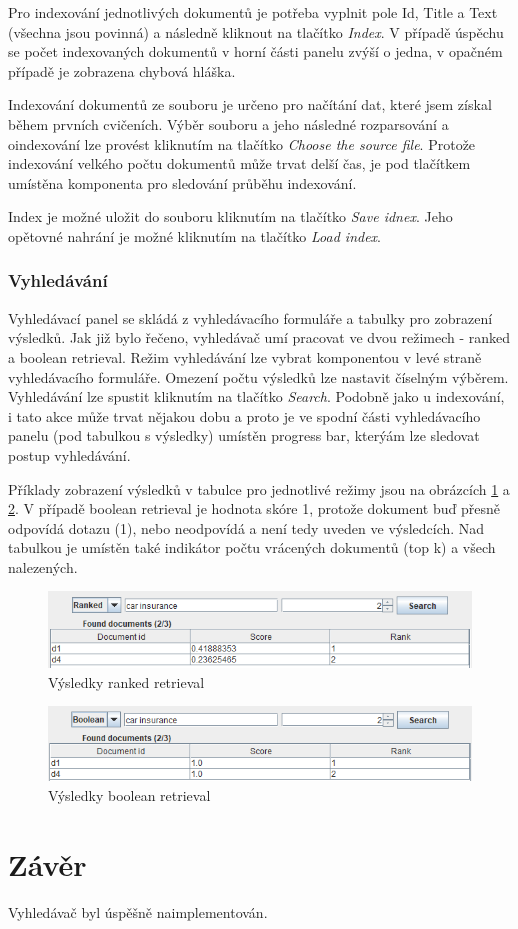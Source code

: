 \documentclass[11pt,a4paper]{scrartcl}
\begin{document}
	Pro indexování jednotlivých dokumentů je potřeba vyplnit pole Id, Title a Text (všechna jsou povinná) a následně kliknout na tlačítko \textit{Index}. V případě úspěchu se počet indexovaných dokumentů v horní části panelu zvýší o jedna, v opačném případě je zobrazena chybová hláška.
	
	Indexování dokumentů ze souboru je určeno pro načítání dat, které jsem získal během prvních cvičeních. Výběr souboru a jeho následné rozparsování a oindexování lze provést kliknutím na tlačítko \textit{Choose the source file}. Protože indexování velkého počtu dokumentů může trvat delší čas, je pod tlačítkem umístěna komponenta pro sledování průběhu indexování. 
	
	Index je možné uložit do souboru kliknutím na tlačítko \textit{Save idnex}. Jeho opětovné nahrání je možné kliknutím na tlačítko \textit{Load index}.

	\subsubsection{Vyhledávání}

	Vyhledávací panel se skládá z vyhledávacího formuláře a tabulky pro zobrazení výsledků. Jak již bylo řečeno, vyhledávač umí pracovat ve dvou režimech - ranked a boolean retrieval. Režim vyhledávání lze vybrat komponentou v levé straně vyhledávacího formuláře. Omezení počtu výsledků lze nastavit číselným výběrem. Vyhledávání lze spustit kliknutím na tlačítko \textit{Search}. Podobně jako u indexování, i tato akce může trvat nějakou dobu a proto je ve spodní části vyhledávacího panelu (pod tabulkou s výsledky) umístěn progress bar, kterýám lze sledovat postup vyhledávání.   
	
	Příklady zobrazení výsledků v tabulce pro jednotlivé režimy jsou na obrázcích \ref{fig:ranked} a \ref{fig:boolean}. V případě boolean retrieval je hodnota skóre 1, protože dokument buď přesně odpovídá dotazu (1), nebo neodpovídá a není tedy uveden ve výsledcích. Nad tabulkou je umístěn také indikátor počtu vrácených dokumentů (top k) a všech nalezených.

	\begin{figure}[h]
		\centering
		\includegraphics[width=\linewidth]{gui-ranked-res}
		\caption{Výsledky ranked retrieval}
		\label{fig:ranked}
	\end{figure}

	\begin{figure}[h]
		\centering
		\includegraphics[width=\linewidth]{gui-boolean-res}
		\caption{Výsledky boolean retrieval}
		\label{fig:boolean}
	\end{figure}
	
	\section{Závěr}
	
	Vyhledávač byl úspěšně naimplementován.
	
\end{document}
